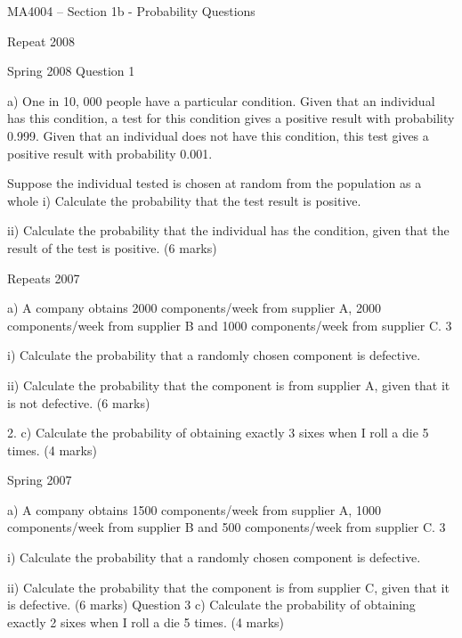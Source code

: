 \documentclass[12pt]{report}
\begin{document}
		
		MA4004 – Section 1b - Probability Questions
		
		Repeat 2008
		
		Spring 2008
		Question 1
		
		a)   One in 10, 000 people have a particular condition. Given that an individual has this condition, a test for this condition gives a positive result with probability 0.999. Given that an individual does not have this condition, this test gives a positive result with probability 0.001.
		
		Suppose the individual tested is chosen at random from the population as a whole
		i)                  Calculate the probability that the test result is positive.
		
		ii)                Calculate the probability that the individual has the condition, given that the result of the test is positive.
		(6 marks)
		
		Repeats 2007
		
		a) A company obtains 2000 components/week from supplier A, 2000 components/week from supplier B and 1000 components/week from supplier C. 3%
		
		i) Calculate the probability that a randomly chosen component is defective.
		
		ii) Calculate the probability that the component is from supplier A, given that it is not defective.
		(6 marks)
		
		2.              c) Calculate the probability of obtaining exactly 3 sixes when I roll a die
		5 times.
		(4 marks)
		
		
		
		
		
		Spring 2007
		
		a) A company obtains 1500 components/week from supplier A, 1000 components/week from supplier B and 500 components/week from supplier C. 3%
		
		i) Calculate the probability that a randomly chosen component is defective.
		
		ii) Calculate the probability that the component is from supplier C, given that it is defective.
		(6 marks)
		Question 3
		c) Calculate the probability of obtaining exactly 2 sixes when I roll a die 5 times.
		(4 marks)
		
\end{document}
